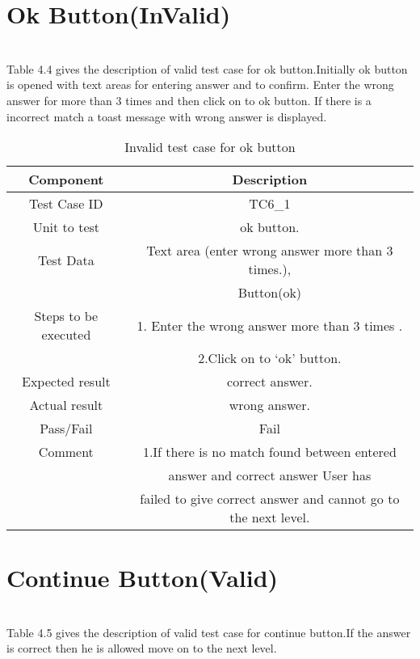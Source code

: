 \section{Ok Button(InValid)}
\hspace{1cm} \\
Table 4.4 gives the description of valid test case for ok button.Initially ok button  is opened with  text areas for entering answer and to confirm. Enter the wrong  answer for more than 3 times and  then click on to ok button.  If there is a incorrect match a toast message with wrong  answer is displayed.\\
\vspace{1cm}
\begin{table}[htb!]
\label{table :tc11}
\centering %
\begin{tabular}{c c} %
\hline\hline %
 Component & Description \\ [0.5ex] %
\hline %
Test Case ID & TC6\_1   \\
Unit to test &ok button. \\ 
Test Data &Text area (enter wrong answer more than 3 times.),\\
&Button(ok)\\
Steps to be executed &1. Enter the wrong answer more than 3 times .\\
&2.Click on to ‘ok’ button.\\
Expected result  &correct answer.\\ 
Actual result &wrong answer.\\
Pass/Fail &Fail\\
Comment &1.If there is no match found between entered\\
& answer and correct answer   User has\\
& failed to give correct answer and  cannot go to the next level.\\

\hline %
\end{tabular}
\caption{Invalid test case for ok button} \label{table:tc11} %
\end{table}

\section{Continue Button(Valid)}
\hspace{1cm} \\
Table 4.5 gives the description of valid test case for continue button.If  the answer is correct then he is allowed move on to the next level.\\

